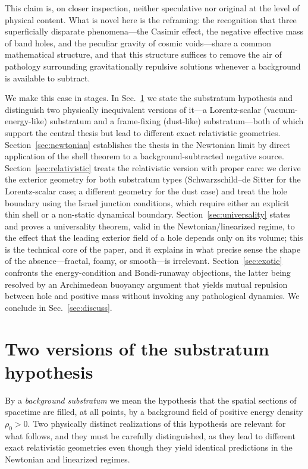 \documentclass[%
  reprint,
  superscriptaddress,
  showpacs,
  showkeys,
  amsmath,amssymb,
  pra,
  longbibliography,
  floatfix,
  x11names
]{revtex4-2}
\begin{document}
This claim is, on closer inspection, neither speculative nor original at the level of physical content. What is novel here is the reframing: the recognition that three superficially disparate phenomena---the Casimir effect, the negative effective mass of band holes, and the peculiar gravity of cosmic voids---share a common mathematical structure, and that this structure suffices to remove the air of pathology surrounding gravitationally repulsive solutions whenever a background is available to subtract.

We make this case in stages. In Sec.~\ref{sec:substratum} we state the substratum hypothesis and distinguish two physically inequivalent versions of it---a Lorentz-scalar (vacuum-energy-like) substratum and a frame-fixing (dust-like) substratum---both of which support the central thesis but lead to different exact relativistic geometries. Section~\ref{sec:newtonian} establishes the thesis in the Newtonian limit by direct application of the shell theorem to a background-subtracted negative source. Section~\ref{sec:relativistic} treats the relativistic version with proper care: we derive the exterior geometry for both substratum types (Schwarzschild--de Sitter for the Lorentz-scalar case; a different geometry for the dust case) and treat the hole boundary using the Israel junction conditions, which require either an explicit thin shell or a non-static dynamical boundary. Section~\ref{sec:universality} states and proves a universality theorem, valid in the Newtonian/linearized regime, to the effect that the leading exterior field of a hole depends only on its volume; this is the technical core of the paper, and it explains in what precise sense the shape of the absence---fractal, foamy, or smooth---is irrelevant. Section~\ref{sec:exotic} confronts the energy-condition and Bondi-runaway objections, the latter being resolved by an Archimedean buoyancy argument that yields mutual repulsion between hole and positive mass without invoking any pathological dynamics. We conclude in Sec.~\ref{sec:discuss}.

\section{Two versions of the substratum hypothesis}
\label{sec:substratum}

By a \emph{background substratum} we mean the hypothesis that the spatial sections of spacetime are filled, at all points, by a background field of positive energy density $\rho_0 > 0$. Two physically distinct realizations of this hypothesis are relevant for what follows, and they must be carefully distinguished, as they lead to different exact relativistic geometries even though they yield identical predictions in the Newtonian and linearized regimes.
\end{document}
